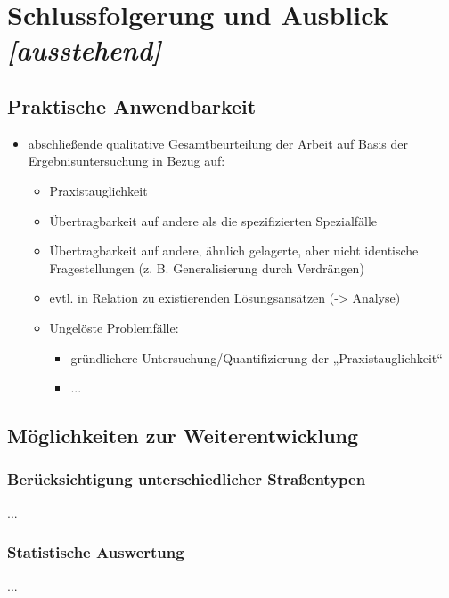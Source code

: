 \documentclass[../main/thesis.tex]{subfiles}
\begin{document}
\chapter{Schlussfolgerung und Ausblick \emph{[ausstehend]}}

\section{Praktische Anwendbarkeit}

\begin{itemize}
	\item abschließende qualitative Gesamtbeurteilung der Arbeit auf Basis der Ergebnisuntersuchung in Bezug auf:
	\begin{itemize}
		\item Praxistauglichkeit
		\item Übertragbarkeit auf andere als die spezifizierten Spezialfälle
		\item Übertragbarkeit auf andere, ähnlich gelagerte, aber nicht identische Fragestellungen (z. B. Generalisierung durch Verdrängen)
		\item evtl. in Relation zu existierenden Lösungsansätzen (-> Analyse)
		\item Ungelöste Problemfälle:
		\begin{itemize}
			\item gründlichere Untersuchung/Quantifizierung der „Praxistauglichkeit“
			\item ...
		\end{itemize}
	\end{itemize}
\end{itemize}



\section{Möglichkeiten zur Weiterentwicklung}



\subsection{Berücksichtigung unterschiedlicher Straßentypen}
...



\subsection{Statistische Auswertung}
...
\end{document}
